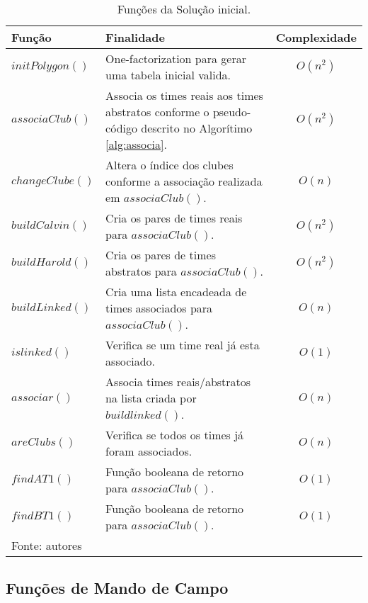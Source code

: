 \documentclass[12pt,a4paper]{article}
\begin{document}
\begin{table}[H]
	\renewcommand{\arraystretch}{1}
	\centering
	\caption{Funções da Solução inicial.}
	\label{tab:s0}
	\begin{tabular}{p{2.7cm} p{9.5cm} c}
		\toprule 
		Função & Finalidade & Complexidade \\ 
		\midrule
		$initPolygon()$ & One-factorization para gerar uma tabela inicial valida. & $O(n^2)$ \\
		$associaClub()$ & Associa os times reais aos times abstratos conforme o pseudo-código descrito no Algorítimo \ref{alg:associa}. & $O(n^2)$ \\
		$changeClube()$ & Altera o índice dos clubes conforme a associação realizada em $associaClub()$. & $O(n)$ \\
		$buildCalvin()$ & Cria os pares de times reais para $associaClub()$. & $O(n^2)$ \\
		$buildHarold()$ & Cria os pares de times abstratos para $associaClub()$. & $O(n^2)$ \\
		$buildLinked()$ & Cria uma lista encadeada de times associados para $associaClub()$. & $O(n)$ \\
		$islinked()$ & Verifica se um time real já esta associado. & $O(1)$ \\
		$associar()$ & Associa times reais/abstratos na lista criada por $buildlinked()$. & $O(n)$ \\
		$areClubs()$ & Verifica se todos os times já foram associados. & $O(n)$ \\
		$findAT1()$ & Função booleana de retorno para $associaClub()$. & $O(1)$ \\
		$findBT1()$ & Função booleana de retorno para $associaClub()$. & $O(1)$ \\
		\bottomrule
		\footnotesize Fonte: autores
	\end{tabular}
\end{table}

\subsection{Funções de Mando de Campo}
\end{document}
